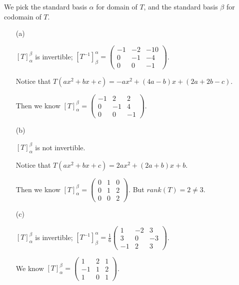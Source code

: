 \begin{Exercise}
We pick the standard basis $\alpha$ for domain of $T$, and the standard basis $\beta$ for codomain of $T$.
\begin{enumerate}[(a)]
\item[(a)]
\begin{answer}
$[T]_{\alpha}^{\beta}$ is invertible; $[T^{-1}]_{\beta}^{\alpha} = \begin{pmatrix}
-1 & -2 & -10 \\
0 & -1 & -4 \\
0 & 0 & -1
\end{pmatrix}$.
\end{answer}
\begin{solution}
Notice that $T(a x^2 +b x+c) = -a x^2 + (4a-b)x+(2a+2b-c)$. 

Then we know $[T]_{\alpha}^{\beta}=\begin{pmatrix}
-1 & 2 & 2 \\
0 & -1 & 4 \\
0 & 0 & -1
\end{pmatrix}$.
\end{solution}

\item[(b)]
\begin{answer}
$[T]_{\alpha}^{\beta}$ is not invertible.
\end{answer}
\begin{solution}
Notice that $T(a x^2 +b x+c) = 2a x^2 + (2a+b)x+b$. 

Then we know $[T]_{\alpha}^{\beta}=\begin{pmatrix}
0 & 1 & 0 \\
0 & 1 & 2 \\
0 & 0 & 2
\end{pmatrix}$. But $rank(T) = 2 \neq 3$.
\end{solution}

\item[(c)]
\begin{answer}
$[T]_{\alpha}^{\beta}$ is invertible; $[T^{-1}]_{\beta}^{\alpha} = \frac{1}{6}\begin{pmatrix}
1 & -2 & 3 \\
3 & 0 & -3 \\
-1 & 2 & 3
\end{pmatrix}$.
\end{answer}
\begin{solution}
We know $[T]_{\alpha}^{\beta}=\begin{pmatrix}
1 & 2 & 1 \\
-1 & 1 & 2 \\
1 & 0 & 1
\end{pmatrix}$.
\end{solution}
\end{enumerate}
\end{Exercise}